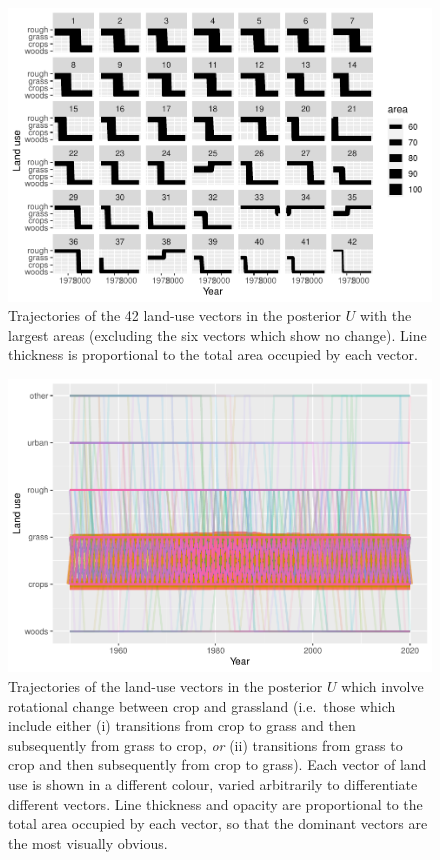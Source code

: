 \documentclass[
]{book}
\begin{document}
\begin{figure}
\centering
\includegraphics{Results_sc_files/figure-latex/plotv2-1.pdf}
\caption{\label{fig:plotv2}Trajectories of the 42 land-use vectors in the posterior \(U\) with the largest areas (excluding the six vectors which show no change). Line thickness is proportional to the total area occupied by each vector.}
\end{figure}

\begin{figure}
\centering
\includegraphics{Results_sc_files/figure-latex/plotcgr-1.pdf}
\caption{\label{fig:plotcgr}Trajectories of the land-use vectors in the posterior \(U\) which involve rotational change between crop and grassland (i.e.~those which include either (i) transitions from crop to grass and then subsequently from grass to crop, \emph{or} (ii) transitions from grass to crop and then subsequently from crop to grass). Each vector of land use is shown in a different colour, varied arbitrarily to differentiate different vectors. Line thickness and opacity are proportional to the total area occupied by each vector, so that the dominant vectors are the most visually obvious.}
\end{figure}
\end{document}
